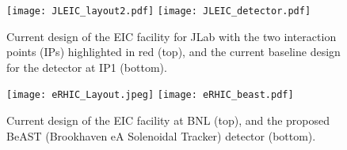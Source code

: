 \begin{figure}[!htb]
	\centering
	\texttt{[image: JLEIC\_layout2.pdf]}
	\texttt{[image: JLEIC\_detector.pdf]}
	\caption{Current design of the EIC facility for JLab with the two interaction points (IPs) highlighted in red (top), and the current baseline design for the detector at IP1 (bottom).}
	\label{fig:jleic_layout}
\end{figure}

\begin{figure}[!htb]
	\centering
	\texttt{[image: eRHIC\_Layout.jpeg]}
	\texttt{[image: eRHIC\_beast.pdf]}
	\caption{Current design of the EIC facility at BNL (top), and the proposed BeAST (Brookhaven eA Solenoidal Tracker) detector (bottom).}
	\label{fig:erhic_layout}
\end{figure}